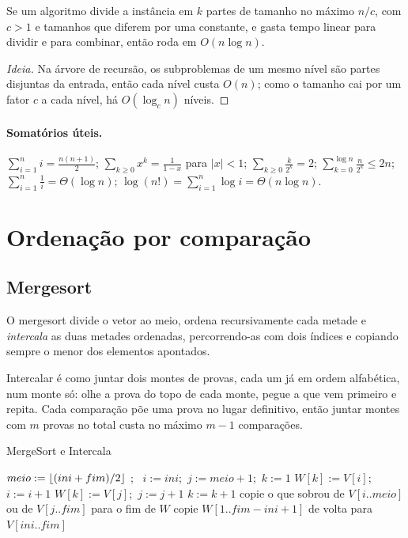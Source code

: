 \begin{teo}
Se um algoritmo divide a instância em $k$ partes de tamanho no máximo $n/c$, com $c>1$ e tamanhos que diferem por uma constante, e gasta tempo linear para dividir e para combinar, então roda em $O(n\log n)$.
\end{teo}
\begin{proof}[Ideia]
Na árvore de recursão, os subproblemas de um mesmo nível são partes disjuntas da entrada, então cada nível custa $O(n)$; como o tamanho cai por um fator $c$ a cada nível, há $O(\log_c n)$ níveis.
\end{proof}

\paragraph{Somatórios úteis.} $\sum_{i=1}^n i=\frac{n(n+1)}2$; $\sum_{k\ge0}x^k=\frac1{1-x}$ para $|x|<1$; $\sum_{k\ge0}\frac{k}{2^k}=2$; $\sum_{k=0}^{\log n}\frac{n}{2^k}\le 2n$; $\sum_{i=1}^n\frac1i=\Theta(\log n)$; $\log(n!)=\sum_{i=1}^n\log i=\Theta(n\log n)$.

\section{Ordenação por comparação}\label{sec:sortcomp}
\subsection*{Mergesort}
O mergesort divide o vetor ao meio, ordena recursivamente cada metade e \emph{intercala} as duas metades ordenadas, percorrendo-as com dois índices e copiando sempre o menor dos elementos apontados.

\begin{intuicao}
Intercalar é como juntar dois montes de provas, cada um já em ordem alfabética, num monte só: olhe a prova do topo de cada monte, pegue a que vem primeiro e repita. Cada comparação põe uma prova no lugar definitivo, então juntar montes com $m$ provas no total custa no máximo $m-1$ comparações.
\end{intuicao}

\begin{pseudo}{MergeSort e Intercala}
\begin{algorithmic}
    \State $meio:=\lfloor(ini+fim)/2\rfloor$
    \State {};\ 
    \State {}
  \EndIf
\EndProcedure
{}
  \State $i:=ini$;\ $j:=meio+1$;\ $k:=1$ 
     \State $W[k]:=V[i]$;\ $i:=i+1$ 
    \Else \State $W[k]:=V[j]$;\ $j:=j+1$
    \EndIf
    \State $k:=k+1$
  \EndWhile
  \State copie o que sobrou de $V[i..meio]$ ou de $V[j..fim]$ para o fim de $W$
  \State copie $W[1..fim-ini+1]$ de volta para $V[ini..fim]$
\EndProcedure
\end{algorithmic}
\end{pseudo}

